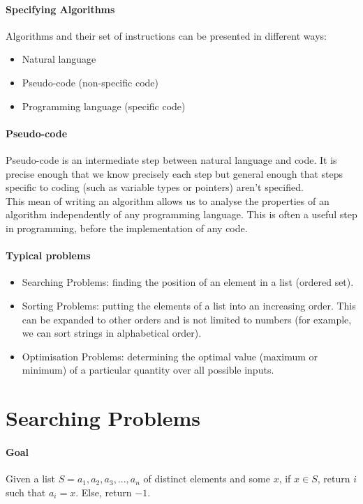 \documentclass[10pt,a4paper]{book}
\begin{document}
\paragraph*{Specifying Algorithms}
Algorithms and their set of instructions can be presented in different ways:
\begin{itemize}
\item Natural language
\item Pseudo-code (non-specific code)
\item Programming language (specific code)
\end{itemize}
\paragraph*{Pseudo-code}
Pseudo-code is an intermediate step between natural language and code. It is precise enough that we know precisely each step but general enough that steps specific to coding (such as variable types or pointers) aren't specified.\\
\hspace*{\parindent} This mean of writing an algorithm allows us to analyse the properties of an algorithm independently of any programming language. This is often a useful step in programming, before the implementation of any code.
\paragraph*{Typical problems}
\begin{itemize}
\item Searching Problems: finding the position of an element in a list (ordered set).
\item Sorting Problems: putting the elements of a list into an increasing order. This can be expanded to other orders and is not limited to numbers (for example, we can sort strings in alphabetical order).
\item Optimisation Problems: determining the optimal value (maximum or minimum) of a particular quantity over all possible inputs. 
\end{itemize}

\section{Searching Problems}
\paragraph*{Goal}
Given a list $S = a_{1},a_{2},a_{3},...,a_{n}$ of distinct elements and some $x$, if $x \in S$, return $i$ such that $a_{i} = x$. Else, return $-1$.
\end{document}
